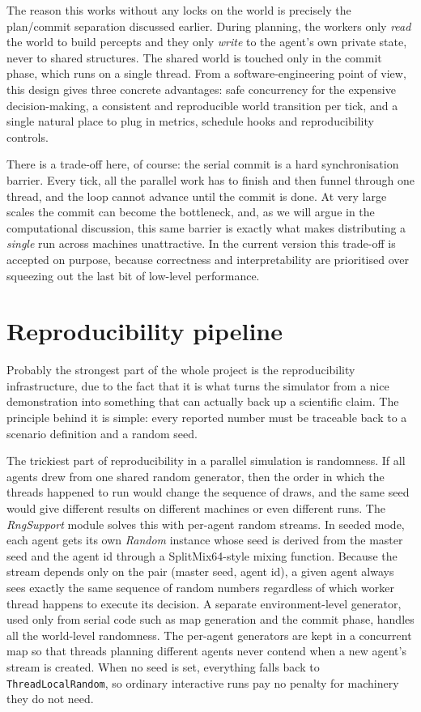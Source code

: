 The reason this works without any locks on the world is precisely the plan/commit separation discussed earlier. During planning, the workers only \emph{read} the world to build percepts and they only \emph{write} to the agent's own private state, never to shared structures. The shared world is touched only in the commit phase, which runs on a single thread. From a software-engineering point of view, this design gives three concrete advantages: safe concurrency for the expensive decision-making, a consistent and reproducible world transition per tick, and a single natural place to plug in metrics, schedule hooks and reproducibility controls.

There is a trade-off here, of course: the serial commit is a hard synchronisation barrier. Every tick, all the parallel work has to finish and then funnel through one thread, and the loop cannot advance until the commit is done. At very large scales the commit can become the bottleneck, and, as we will argue in the computational discussion, this same barrier is exactly what makes distributing a \emph{single} run across machines unattractive. In the current version this trade-off is accepted on purpose, because correctness and interpretability are prioritised over squeezing out the last bit of low-level performance.

\section{Reproducibility pipeline}

Probably the strongest part of the whole project is the reproducibility infrastructure, due to the fact that it is what turns the simulator from a nice demonstration into something that can actually back up a scientific claim. The principle behind it is simple: every reported number must be traceable back to a scenario definition and a random seed.

The trickiest part of reproducibility in a parallel simulation is randomness. If all agents drew from one shared random generator, then the order in which the threads happened to run would change the sequence of draws, and the same seed would give different results on different machines or even different runs. The \emph{RngSupport} module solves this with per-agent random streams. In seeded mode, each agent gets its own \emph{Random} instance whose seed is derived from the master seed and the agent id through a SplitMix64-style mixing function. Because the stream depends only on the pair (master seed, agent id), a given agent always sees exactly the same sequence of random numbers regardless of which worker thread happens to execute its decision. A separate environment-level generator, used only from serial code such as map generation and the commit phase, handles all the world-level randomness. The per-agent generators are kept in a concurrent map so that threads planning different agents never contend when a new agent's stream is created. When no seed is set, everything falls back to \texttt{ThreadLocalRandom}, so ordinary interactive runs pay no penalty for machinery they do not need.

